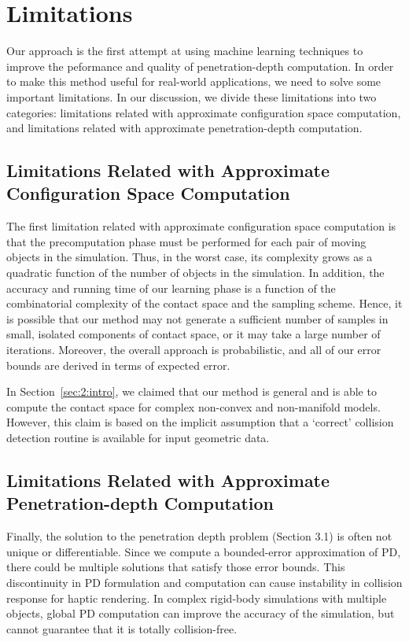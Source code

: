 \section{Limitations}
Our approach is the first attempt at using machine learning techniques to improve the peformance and quality of penetration-depth computation. In order to make this method useful for real-world applications, we need to solve some important limitations. In our discussion, we divide these limitations into two categories: limitations related with approximate configuration space computation, and limitations related with approximate penetration-depth computation.

\subsection{Limitations Related with Approximate Configuration Space Computation}
The first limitation related with approximate configuration space computation is that the precomputation phase must be performed for each pair of moving objects in the simulation. Thus, in the worst case, its complexity grows as a quadratic function of the number of objects in the simulation. In addition, the accuracy and running time of our learning phase is a function of the combinatorial complexity of the contact
space and the sampling scheme. Hence, it is possible that our method may not generate a sufficient number of samples in small,
isolated components of contact space, or it may take a large number of iterations.
Moreover, the overall approach is probabilistic, and all of our error bounds are derived in terms of expected error.

In Section~\ref{sec:2:intro}, we claimed that our method is general and is able to compute the contact space for complex non-convex and non-manifold models. However, this claim is based on the implicit assumption that a `correct' collision detection routine is available for input geometric data.

\subsection{Limitations Related with Approximate Penetration-depth Computation}

Finally, the solution to the penetration depth problem (Section 3.1) is often not unique or differentiable. Since we compute
a bounded-error approximation of PD, there could be multiple solutions that satisfy those error bounds.
This discontinuity in PD formulation and computation can cause instability in collision response for haptic rendering. In complex rigid-body simulations with multiple objects, global PD  computation can improve the accuracy of the simulation, but cannot guarantee that it is totally collision-free.


